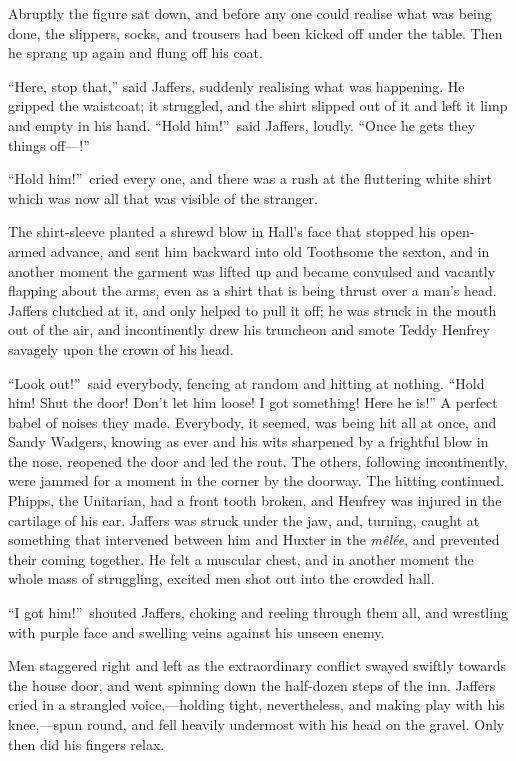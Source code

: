 Abruptly the figure sat down, and before any one could realise what was being done, the slippers, socks, and trousers had been kicked off under the table. Then he sprang up again and flung off his coat.

“Here, stop that,” said Jaffers, suddenly realising what was happening. He gripped the waistcoat; it struggled, and the shirt slipped out of it and left it limp and empty in his hand. “Hold him!”\ said Jaffers, loudly. “Once he gets they things off—!”

“Hold him!”\ cried every one, and there was a rush at the fluttering white shirt which was now all that was visible of the stranger.

The shirt-sleeve planted a shrewd blow in Hall’s face that stopped his open-armed advance, and sent him backward into old Toothsome the sexton, and in another moment the garment was lifted up and became convulsed and vacantly flapping about the arms, even as a shirt that is being thrust over a man’s head. Jaffers clutched at it, and only helped to pull it off; he was struck in the mouth out of the air, and incontinently drew his truncheon and smote Teddy Henfrey savagely upon the crown of his head.

“Look out!”\ said everybody, fencing at random and hitting at nothing. “Hold him! Shut the door! Don’t let him loose! I got something! Here he is!” A perfect babel of noises they made. Everybody, it seemed, was being hit all at once, and Sandy Wadgers, knowing as ever and his wits sharpened by a frightful blow in the nose, reopened the door and led the rout. The others, following incontinently, were jammed for a moment in the corner by the doorway. The hitting continued. Phipps, the Unitarian, had a front tooth broken, and Henfrey was injured in the cartilage of his ear. Jaffers was struck under the jaw, and, turning, caught at something that intervened between him and Huxter in the \emph{mêlée}, and prevented their coming together. He felt a muscular chest, and in another moment the whole mass of struggling, excited men shot out into the crowded hall.

“I got him!”\ shouted Jaffers, choking and reeling through them all, and wrestling with purple face and swelling veins against his unseen enemy.

Men staggered right and left as the extraordinary conflict swayed swiftly towards the house door, and went spinning down the half-dozen steps of the inn. Jaffers cried in a strangled voice,—holding tight, nevertheless, and making play with his knee,—spun round, and fell heavily undermost with his head on the gravel. Only then did his fingers relax.

